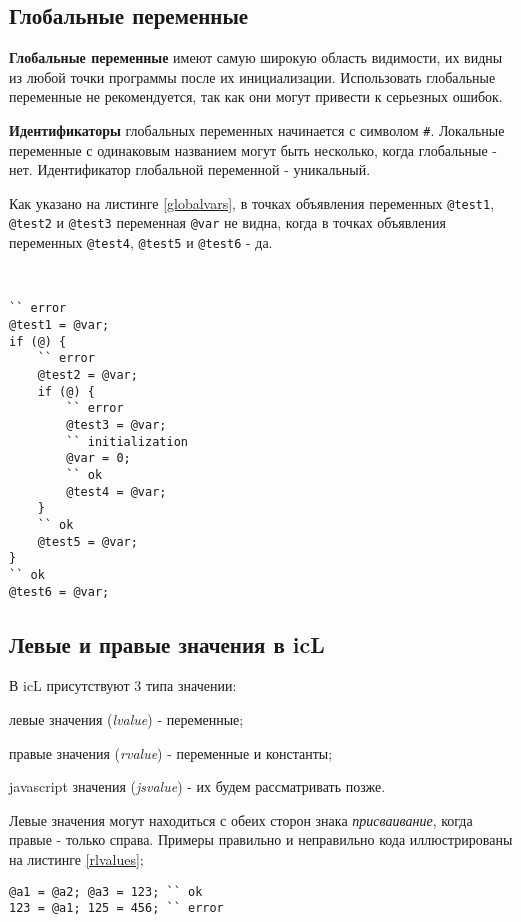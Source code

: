 \subsection{Глобальные переменные}

\textbf{Глобальные переменные} имеют самую широкую область видимости, их видны из любой точки программы после их инициализации. Использовать глобальные переменные не рекомендуется, так как они могут привести к серьезных ошибок.

{\bf Идентификаторы} глобальных переменных начинается с символом {\color{blue2}\lstinline|#|}. Локальные переменные с одинаковым названием могут быть несколько, когда глобальные - нет. Идентификатор глобальной переменной - уникальный.

Как указано на листинге \ref{globalvars}, в точках объявления переменных \lstinline|@test1|, \lstinline|@test2| и \lstinline|@test3| переменная \lstinline|@var| не видна, когда в точках объявления переменных \lstinline|@test4|, \lstinline|@test5| и \lstinline|@test6| - да.

\

\begin{lstlisting}[caption=Область видимости глобальных перемен, label=globalvars]
`` error
@test1 = @var;
if (@) {
	`` error
	@test2 = @var;
	if (@) {
		`` error
		@test3 = @var;
		`` initialization
		@var = 0;
		`` ok
		@test4 = @var;
	}
	`` ok
	@test5 = @var;
}
`` ok
@test6 = @var;
\end{lstlisting}

\subsection{Левые и правые значения в icL}

В icL присутствуют 3 типа значении:

\begin{icEnum}
\item
	левые значения ({\it lvalue}) - переменные;
\item
	правые значения ({\it rvalue}) - переменные и константы;
\item
	javascript значения ({\it jsvalue}) - их будем рассматривать позже.
\end{icEnum}

Левые значения могут находиться с обеих сторон знака {\it присваивание}, когда правые - только справа. Примеры правильно и неправильно кода иллюстрированы на листинге \ref{rlvalues};

\begin{lstlisting}[caption=Левые и правые значения, label=rlvalues]
@a1 = @a2; @a3 = 123; `` ok
123 = @a1; 125 = 456; `` error
\end{lstlisting}

